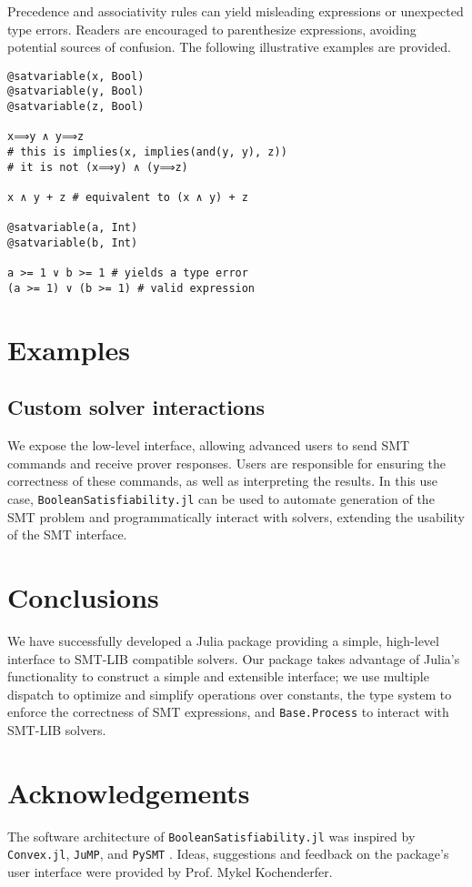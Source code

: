\documentclass[conference]{IEEEtran}
\begin{document}
Precedence and associativity rules can yield misleading expressions or unexpected type errors. Readers are encouraged to parenthesize expressions, avoiding potential sources of confusion. The following illustrative examples are provided.

\begin{verbatim}
@satvariable(x, Bool)
@satvariable(y, Bool)
@satvariable(z, Bool)

x⟹y ∧ y⟹z
# this is implies(x, implies(and(y, y), z))
# it is not (x⟹y) ∧ (y⟹z)

x ∧ y + z # equivalent to (x ∧ y) + z

@satvariable(a, Int)
@satvariable(b, Int)

a >= 1 ∨ b >= 1 # yields a type error
(a >= 1) ∨ (b >= 1) # valid expression
\end{verbatim}

\section{Examples}

\subsection*{Custom solver interactions}
We expose the low-level interface, allowing advanced users to send SMT commands and receive prover responses. Users are responsible for ensuring the correctness of these commands, as well as interpreting the results. In this use case, \verb|BooleanSatisfiability.jl| can be used to automate generation of the SMT problem and programmatically interact with solvers, extending the usability of the SMT interface.

\section{Conclusions}
We have successfully developed a Julia package providing a simple, high-level interface to SMT-LIB compatible solvers. Our package takes advantage of Julia's functionality to construct a simple and extensible interface; we use multiple dispatch to optimize and simplify operations over constants, the type system to enforce the correctness of SMT expressions, and \verb|Base.Process| to interact with SMT-LIB solvers.

\section{Acknowledgements}
The software architecture of \verb|BooleanSatisfiability.jl| was inspired by \verb|Convex.jl|, \verb|JuMP|, and \verb|PySMT| \cite{convexjl, Lubin2023, pysmt2015}. Ideas, suggestions and feedback on the package's user interface were provided by Prof. Mykel Kochenderfer.
\end{document}
